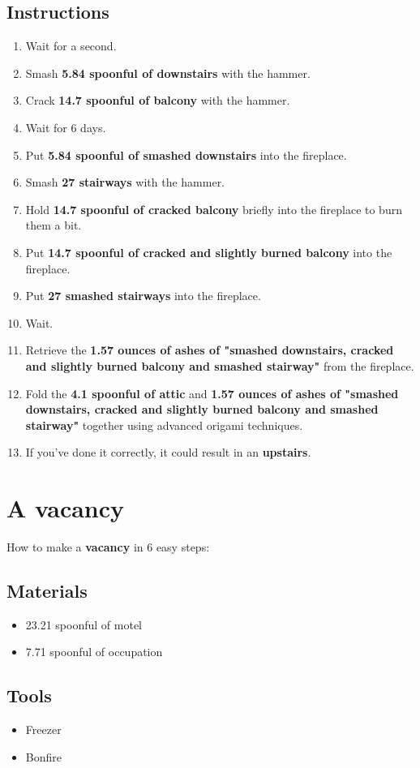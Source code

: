 \documentclass{article}
\begin{document}
\subsection{Instructions}\begin{enumerate}
\item 
Wait for a second.
\item 
Smash \textbf{5.84 spoonful of downstairs} with the hammer.
\item 
Crack \textbf{14.7 spoonful of balcony} with the hammer.
\item 
Wait for 6 days.
\item 
Put \textbf{5.84 spoonful of smashed downstairs} into the fireplace.
\item 
Smash \textbf{27 stairways} with the hammer.
\item 
Hold \textbf{14.7 spoonful of cracked balcony} briefly into the fireplace to burn them a bit.
\item 
Put \textbf{14.7 spoonful of cracked and slightly burned balcony} into the fireplace.
\item 
Put \textbf{27 smashed stairways} into the fireplace.
\item 
Wait.
\item 
Retrieve the \textbf{1.57 ounces of ashes of "smashed downstairs, cracked and slightly burned balcony and smashed stairway"} from the fireplace.
\item 
Fold the \textbf{4.1 spoonful of attic} and \textbf{1.57 ounces of ashes of "smashed downstairs, cracked and slightly burned balcony and smashed stairway"} together using advanced origami techniques.
\item 
If you've done it correctly, it could result in an \textbf{upstairs}.
\end{enumerate}
\newpage
\section{A vacancy}How to make a \textbf{vacancy} in 6 easy steps:

\subsection{Materials}\begin{itemize}
\item 
23.21 spoonful of motel
\item 
7.71 spoonful of occupation
\end{itemize}
\subsection{Tools}\begin{itemize}
\item 
Freezer
\item 
Bonfire
\end{itemize}
\end{document}
